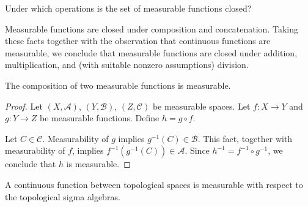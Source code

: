 
\sbasic



























\sstart
{}


Under which operations is
the set of measurable
functions closed?


Measurable functions are closed
under composition and concatenation.
Taking these facts
together with the observation
that continuous functions
are measurable, we conclude
that measurable
functions are closed under
addition, multiplication,
and (with suitable nonzero
assumptions) division.


\begin{prop}
The composition of two
measurable functions
is measurable.
\begin{proof}
Let
$(X, \mathcal{A})$,
$(Y, \mathcal{B})$,
$(Z, \mathcal{C})$
be measurable spaces.
Let $f: X \to Y$
and $g: Y \to Z$ be
measurable functions.
Define $h = g \circ f$.

Let $C \in \mathcal{C}$.
Measurability of $g$
implies
$g^{-1}(C) \in \mathcal{B}$.
This fact, together with
measurability of $f$,
implies
$f^{-1}(g^{-1}(C)) \in \mathcal{A}$.
Since $h^{-1} = f^{-1} \circ g^{-1}$,
we conclude that
$h$ is measurable.
\end{proof}
\end{prop}

\begin{prop}
  A continuous function
  between topological
  spaces
  is measurable with
  respect to the
  topological sigma algebras.
\end{prop}

